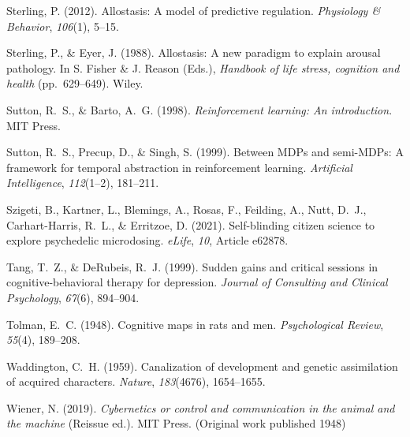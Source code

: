 \documentclass[12pt,fleqn]{article}
\begin{document}
\begin{thebibliography}{}
  Sterling, P. (2012).
  Allostasis: A model of predictive regulation.
  \emph{Physiology \& Behavior}, \emph{106}(1), 5--15.

  Sterling, P., \& Eyer, J. (1988).
  Allostasis: A new paradigm to explain arousal pathology.
  In S. Fisher \& J. Reason (Eds.), \emph{Handbook of life stress, cognition and health} (pp.~629--649).
  Wiley.

  Sutton, R.~S., \& Barto, A.~G. (1998).
  \emph{Reinforcement learning: An introduction}.
  MIT Press.

  Sutton, R.~S., Precup, D., \& Singh, S. (1999).
  Between MDPs and semi-MDPs: A framework for temporal abstraction in reinforcement learning.
  \emph{Artificial Intelligence}, \emph{112}(1--2), 181--211.

  Szigeti, B., Kartner, L., Blemings, A., Rosas, F., Feilding, A., Nutt, D.~J., Carhart-Harris, R.~L., \& Erritzoe, D. (2021).
  Self-blinding citizen science to explore psychedelic microdosing.
  \emph{eLife}, \emph{10}, Article e62878.

  Tang, T.~Z., \& DeRubeis, R.~J. (1999).
  Sudden gains and critical sessions in cognitive-behavioral therapy for depression.
  \emph{Journal of Consulting and Clinical Psychology}, \emph{67}(6), 894--904.

  Tolman, E.~C. (1948).
  Cognitive maps in rats and men.
  \emph{Psychological Review}, \emph{55}(4), 189--208.

  Waddington, C.~H. (1959).
  Canalization of development and genetic assimilation of acquired characters.
  \emph{Nature}, \emph{183}(4676), 1654--1655.

  Wiener, N. (2019).
  \emph{Cybernetics or control and communication in the animal and the machine} (Reissue ed.).
  MIT Press.
  (Original work published 1948)


\end{thebibliography}
\end{document}
